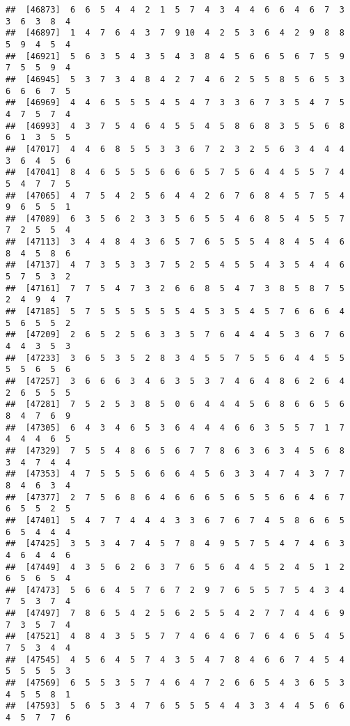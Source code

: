 \documentclass[
]{book}
\begin{document}
\begin{verbatim}
##  [46873]  6  6  5  4  4  2  1  5  7  4  3  4  4  6  6  4  6  7  3  3  6  3  8  4
##  [46897]  1  4  7  6  4  3  7  9 10  4  2  5  3  6  4  2  9  8  8  5  9  4  5  4
##  [46921]  5  6  3  5  4  3  5  4  3  8  4  5  6  6  5  6  7  5  9  7  5  5  9  4
##  [46945]  5  3  7  3  4  8  4  2  7  4  6  2  5  5  8  5  6  5  3  6  6  6  7  5
##  [46969]  4  4  6  5  5  5  4  5  4  7  3  3  6  7  3  5  4  7  5  4  7  5  7  4
##  [46993]  4  3  7  5  4  6  4  5  5  4  5  8  6  8  3  5  5  6  8  6  1  3  5  5
##  [47017]  4  4  6  8  5  5  3  3  6  7  2  3  2  5  6  3  4  4  4  3  6  4  5  6
##  [47041]  8  4  6  5  5  5  6  6  6  5  7  5  6  4  4  5  5  7  4  5  4  7  7  5
##  [47065]  4  7  5  4  2  5  6  4  4  2  6  7  6  8  4  5  7  5  4  9  6  5  5  1
##  [47089]  6  3  5  6  2  3  3  5  6  5  5  4  6  8  5  4  5  5  7  7  2  5  5  4
##  [47113]  3  4  4  8  4  3  6  5  7  6  5  5  5  4  8  4  5  4  6  8  4  5  8  6
##  [47137]  4  7  3  5  3  3  7  5  2  5  4  5  5  4  3  5  4  4  6  5  7  5  3  2
##  [47161]  7  7  5  4  7  3  2  6  6  8  5  4  7  3  8  5  8  7  5  2  4  9  4  7
##  [47185]  5  7  5  5  5  5  5  5  4  5  3  5  4  5  7  6  6  6  4  5  6  5  5  2
##  [47209]  2  6  5  2  5  6  3  3  5  7  6  4  4  4  5  3  6  7  6  4  4  3  5  3
##  [47233]  3  6  5  3  5  2  8  3  4  5  5  7  5  5  6  4  4  5  5  5  5  6  5  6
##  [47257]  3  6  6  6  3  4  6  3  5  3  7  4  6  4  8  6  2  6  4  2  6  5  5  5
##  [47281]  7  5  2  5  3  8  5  0  6  4  4  4  5  6  8  6  6  5  6  8  4  7  6  9
##  [47305]  6  4  3  4  6  5  3  6  4  4  4  6  6  3  5  5  7  1  7  4  4  4  6  5
##  [47329]  7  5  5  4  8  6  5  6  7  7  8  6  3  6  3  4  5  6  8  3  4  7  4  4
##  [47353]  4  7  5  5  5  6  6  6  4  5  6  3  3  4  7  4  3  7  7  8  4  6  3  4
##  [47377]  2  7  5  6  8  6  4  6  6  6  5  6  5  5  6  6  4  6  7  6  5  5  2  5
##  [47401]  5  4  7  7  4  4  4  3  3  6  7  6  7  4  5  8  6  6  5  6  5  4  4  4
##  [47425]  3  5  3  4  7  4  5  7  8  4  9  5  7  5  4  7  4  6  3  4  6  4  4  6
##  [47449]  4  3  5  6  2  6  3  7  6  5  6  4  4  5  2  4  5  1  2  6  5  6  5  4
##  [47473]  5  6  6  4  5  7  6  7  2  9  7  6  5  5  7  5  4  3  4  7  5  3  7  4
##  [47497]  7  8  6  5  4  2  5  6  2  5  5  4  2  7  7  4  4  6  9  7  3  5  7  4
##  [47521]  4  8  4  3  5  5  7  7  4  6  4  6  7  6  4  6  5  4  5  7  5  3  4  4
##  [47545]  4  5  6  4  5  7  4  3  5  4  7  8  4  6  6  7  4  5  4  5  5  5  5  3
##  [47569]  6  5  5  3  5  7  4  6  4  7  2  6  6  5  4  3  6  5  3  4  5  5  8  1
##  [47593]  5  6  5  3  4  7  6  5  5  5  4  4  3  3  4  4  5  6  6  4  5  7  7  6

\end{verbatim}
\end{document}
